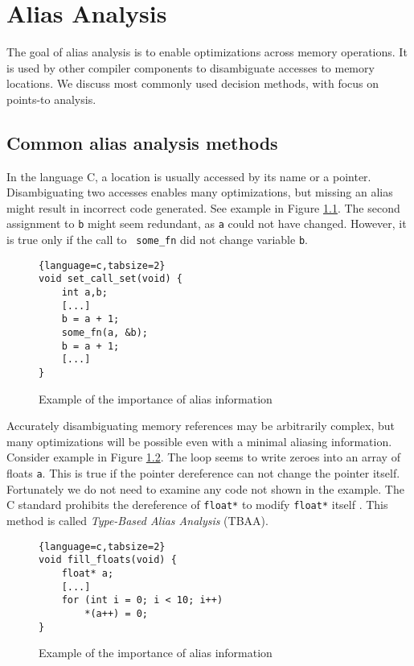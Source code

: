 \chapter{Alias Analysis}

The goal of alias analysis is to enable optimizations across memory operations.
It is used by other compiler components to disambiguate accesses to memory
locations. We discuss most commonly used decision methods, with focus on points-to
analysis.

\section{Common alias analysis methods}

In the language C, a location is usually accessed by its name or a
pointer. Disambiguating two accesses enables many optimizations, but missing an
alias might result in incorrect code generated. See example in Figure
\ref{alias-example1}. The second assignment to {\tt b} might seem redundant, as
{\tt a} could not have changed.  However, it is true only if the call to {\tt
some\_fn} did not change variable {\tt b}.

\begin{figure}[h!]
\begin{tcolorbox}
\begin{lstlisting}{language=c,tabsize=2}
void set_call_set(void) {
	int a,b;
	[...]
	b = a + 1;
	some_fn(a, &b);
	b = a + 1;
	[...]
}
\end{lstlisting}
\end{tcolorbox}
\caption{Example of the importance of alias information}
\label{alias-example1}
\end{figure}

Accurately disambiguating memory references may be arbitrarily complex, but many
optimizations will be possible even with a minimal aliasing information.
Consider example in Figure \ref{alias-example2}. The loop seems to write zeroes
into an array of floats {\tt a}. This is true if the pointer dereference can not
change the pointer itself. Fortunately we do not need to examine any code not
shown in the example. The C standard prohibits the dereference of {\tt float*}
to modify {\tt float*} itself \cite{isoc}. This method is called {\it Type-Based
Alias Analysis} (TBAA).

\begin{figure}[h!]
\begin{tcolorbox}
\begin{lstlisting}{language=c,tabsize=2}
void fill_floats(void) {
	float* a;
	[...]
	for (int i = 0; i < 10; i++)
		*(a++) = 0;
}
\end{lstlisting}
\end{tcolorbox}
	\caption{Example of the importance of alias information}
	\label{alias-example2}
\end{figure}

